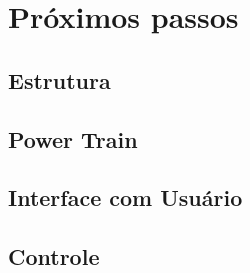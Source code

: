 \section{Próximos passos}
  \subsection{Estrutura}
  \subsection{Power Train}
  \subsection{Interface com Usuário}
  \subsection{Controle}
